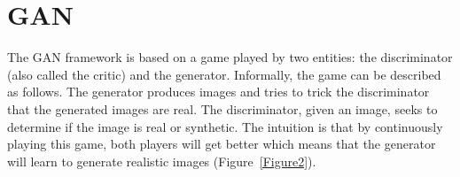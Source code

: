\documentclass[10pt,twocolumn,letterpaper]{article}
\begin{document}
  	\section{GAN}
  	The GAN framework is based on a game played by two entities: the discriminator (also
  	called the critic) and the generator. Informally, the game can be described as follows. The
  	generator produces images and tries to trick the discriminator that the generated images
  	are real. The discriminator, given an image, seeks to determine if the image is real or
  	synthetic. The intuition is that by continuously playing this game, both players will get
  	better which means that the generator will learn to generate realistic images (Figure~\ref{Figure2}).


\end{document}
